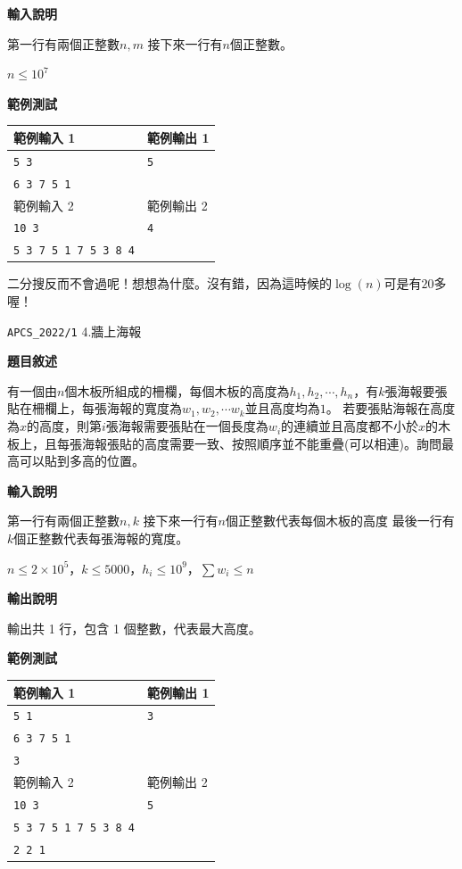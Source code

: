    \textbf{輸入說明}

    第一行有兩個正整數$n, m$
    接下來一行有$n$個正整數。

    $n \le 10^7$

    \textbf{範例測試}

    \begin{tabular}{|m{7cm}|m{7cm}|}
        \hline
        範例輸入 1 & 範例輸出 1 \\
        \hline
        \verb|5 3|       &  \verb|5| \\
        \verb|6 3 7 5 1| &  \\
        \hline
        範例輸入 2 & 範例輸出 2 \\
        \hline
        \verb|10 3|                &  \verb|4| \\
        \verb|5 3 7 5 1 7 5 3 8 4| &  \\
        \hline
    \end{tabular}

    \begin{tip}
        二分搜反而不會過呢！想想為什麼。沒有錯，因為這時候的$\log(n)$可是有$20$多喔！
    \end{tip}

    \problem \verb|APCS_2022/1| 4.牆上海報

    \textbf{題目敘述}

    有一個由$n$個木板所組成的柵欄，每個木板的高度為$h_1, h_2, \cdots , h_n$，有$k$張海報要張貼在柵欄上，每張海報的寬度為$w_1, w_2, \cdots w_k$並且高度均為$1$。
    若要張貼海報在高度為$x$的高度，則第$i$張海報需要張貼在一個長度為$w_i$的連續並且高度都不小於$x$的木板上，且每張海報張貼的高度需要一致、按照順序並不能重疊(可以相連)。詢問最高可以貼到多高的位置。

    \textbf{輸入說明}

    第一行有兩個正整數$n, k$
    接下來一行有$n$個正整數代表每個木板的高度
    最後一行有$k$個正整數代表每張海報的寬度。

    $n \le 2 \times 10^5$，$k \le 5000$，$h_i \le 10^9$，$\sum{w_i} \le n$

    \textbf{輸出說明}
    
    輸出共 1 行，包含 1 個整數，代表最大高度。

    \textbf{範例測試}

    \begin{tabular}{|m{7cm}|m{7cm}|}
        \hline
        範例輸入 1 & 範例輸出 1 \\
        \hline
        \verb|5 1|       &  \verb|3| \\
        \verb|6 3 7 5 1| &  \\
        \verb|3|         &  \\
        \hline
        範例輸入 2 & 範例輸出 2 \\
        \hline
        \verb|10 3|                &  \verb|5| \\
        \verb|5 3 7 5 1 7 5 3 8 4| &  \\
        \verb|2 2 1| &  \\
        \hline
    \end{tabular}